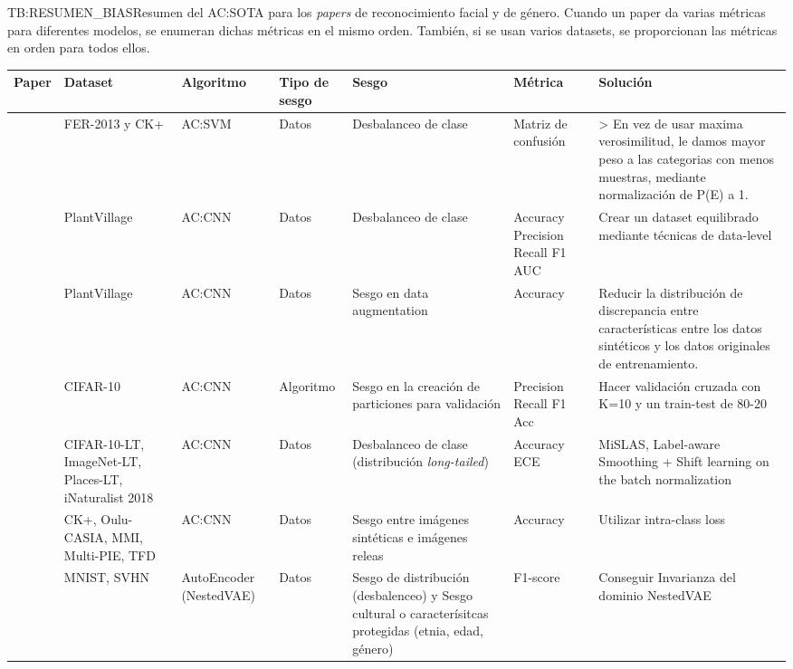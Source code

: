 \begin{table}[Resumen de papers género]{TB:RESUMEN_BIAS}{Resumen del \ac{AC:SOTA} para los \textit{papers} de reconocimiento facial y de género. Cuando un paper da varias métricas para diferentes modelos, se enumeran dichas métricas en el mismo orden. También, si se usan varios datasets, se proporcionan las métricas en orden para todos ellos.}
  \begin{tabular}{cpppppp}
    \hline
    \textbf{Paper} & \textbf{Dataset} & \textbf{Algoritmo} & \textbf{Tipo de sesgo} & \textbf{Sesgo} & \textbf{Métrica} & \textbf{Solución} \\
    \hline \hline
    \cite{zhao2021lightweight} & FER-2013 y CK+ & \acs{AC:SVM} & Datos & Desbalanceo de clase & Matriz de confusión & > En vez de usar maxima verosimilitud, le damos mayor peso a las categorias con menos muestras, mediante normalización de P(E) a 1. \\
    \hline
    \cite{nafi2020addressing} & PlantVillage & \acs{AC:CNN} & Datos & Desbalanceo de clase & Accuracy Precision Recall F1 AUC & Crear un dataset equilibrado mediante técnicas de data-level \\
    \hline
    \cite{yilma2021generation} & PlantVillage & \acs{AC:CNN} & Datos & Sesgo en data augmentation & Accuracy & Reducir la distribución de discrepancia entre características entre los datos sintéticos y los datos originales de entrenamiento. \\
    \hline
    \cite{chansong2021impacts} & CIFAR-10 & \acs{AC:CNN} & Algoritmo & Sesgo en la creación de particiones para validación & Precision Recall F1 Acc & Hacer validación cruzada con K=10 y un train-test de 80-20 \\
    \hline
    \cite{zhong2021improving} & CIFAR-10-LT, ImageNet-LT, Places-LT, iNaturalist 2018 & \acs{AC:CNN} & Datos & Desbalanceo de clase (distribución \textit{long-tailed}) & Accuracy ECE & MiSLAS, Label-aware Smoothing + Shift learning on the batch normalization \\
    \hline
    \cite{yan2019joint} & CK+, Oulu-CASIA, MMI, Multi-PIE, TFD & \acs{AC:CNN} & Datos & Sesgo entre imágenes sintéticas e imágenes releas & Accuracy & Utilizar intra-class loss \\
    \hline
    \cite{vowels2020nestedvae} & MNIST, SVHN & AutoEncoder (NestedVAE) & Datos & Sesgo de distribución (desbalenceo) y Sesgo cultural o caracterísitcas protegidas (etnia, edad, género) & F1-score & Conseguir Invarianza del dominio NestedVAE \\

\end{tabular}
\end{table}
